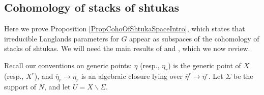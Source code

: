 \documentclass{article}
\def\F{\mathbf{F}}
\begin{document}




%














\subsection{Cohomology of stacks of shtukas}
\label{sec:CohoShtukas}


Here we prove Proposition \ref{PropCohoOfShtukaSpaceIntro}, which states that irreducible Langlands parameters for $G$ appear as subspaces of the cohomology of stacks of shtukas.  We will need the main results of  \cite{Xue} and \cite{XueFiniteness}, which we now review.

Recall our conventions on generic points:  $\eta$ (resp., $\eta_r$) is the generic point of $X$ (resp., $X^r$), and $\overline{\eta}_r\to \eta_r$ is an algebraic closure lying over $\overline{\eta}^r\to \eta^r$.   Let $\Sigma$ be the support of $N$, and let $U=X\smallsetminus \Sigma$.
\end{document}
